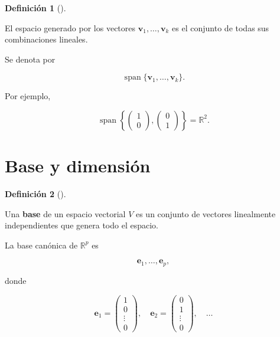 \documentclass[
  spanish,
  10.5pt,
  letterpaper,
  DIV=11,
  numbers=noendperiod,
  oneside,
  open=any]{scrreprt}
\theoremstyle{definition}
\newtheorem{definition}{Definición}[chapter]
\theoremstyle{definition}
\theoremstyle{plain}
\theoremstyle{remark}
\begin{document}

\begin{definition}[]\protect\hypertarget{def-espacio-generado}{}\label{def-espacio-generado}

El espacio generado por los vectores
\(\mathbf{v}_1,\ldots,\mathbf{v}_k\) es el conjunto de todas sus
combinaciones lineales.

\end{definition}

Se denota por

\[
\operatorname{span}
\{\mathbf{v}_1,\ldots,\mathbf{v}_k\}.
\]

Por ejemplo,

\[
\operatorname{span}
\left\{
\begin{pmatrix}
1\\
0
\end{pmatrix},
\begin{pmatrix}
0\\
1
\end{pmatrix}
\right\}
=
\mathbb{R}^{2}.
\]

\section*{Base y dimensión}\label{base-y-dimensiuxf3n}


\begin{definition}[]\protect\hypertarget{def-base}{}\label{def-base}

Una \textbf{base} de un espacio vectorial \(V\) es un conjunto de
vectores linealmente independientes que genera todo el espacio.

\end{definition}

La base canónica de \(\mathbb{R}^{p}\) es

\[
\mathbf{e}_1,\ldots,\mathbf{e}_p,
\]

donde

\[
\mathbf{e}_1=
\begin{pmatrix}
1\\
0\\
\vdots\\
0
\end{pmatrix},
\quad
\mathbf{e}_2=
\begin{pmatrix}
0\\
1\\
\vdots\\
0
\end{pmatrix},
\quad\ldots
\]
\end{document}
